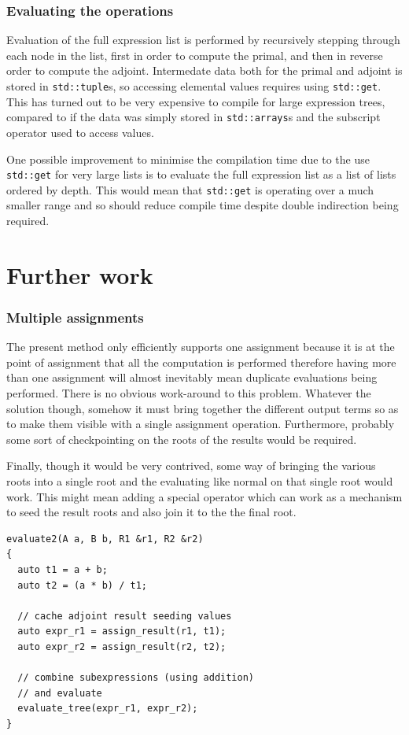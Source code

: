 \documentclass[a4paper,10pt]{article}
\begin{document}
\subsubsection{Evaluating the operations}
Evaluation of the full expression list is performed by recursively stepping through each node in the list, first in order to compute the primal, and then in reverse order to compute the adjoint. Intermedate data both for the primal and adjoint is stored in \texttt{std::tuple}s, so accessing elemental values requires using \texttt{std::get}. This has turned out to be very expensive to compile for large expression trees, compared to if the data was simply stored in \texttt{std::arrays}s and the subscript operator used to access values.

One possible improvement to minimise the compilation time due to the use \texttt{std::get} for very large lists is to evaluate the full expression list as a list of lists ordered by depth. This would mean that \texttt{std::get} is operating over a much smaller range and so should reduce compile time despite double indirection being required.

\section{Further work}
\subsubsection{Multiple assignments}
The present method only efficiently supports one assignment because it is at the point of assignment that all the computation is performed therefore having more than one assignment will almost inevitably mean duplicate evaluations being performed. There is no obvious work-around to this problem. Whatever the solution though, somehow it must bring together the different output terms so as to make them visible with a single assignment operation. Furthermore, probably some sort of checkpointing on the roots of the results would be required.

Finally, though it would be very contrived, some way of bringing the various roots into a single root and the evaluating like normal on that single root would work. This might mean adding a special operator which can work as a mechanism to seed the result roots and also join it to the the final root.\newline
\begin{lstlisting}[caption={Combining multiple roots into one.}, label=lst:multiple-roots]
evaluate2(A a, B b, R1 &r1, R2 &r2)
{
  auto t1 = a + b;
  auto t2 = (a * b) / t1;

  // cache adjoint result seeding values
  auto expr_r1 = assign_result(r1, t1);
  auto expr_r2 = assign_result(r2, t2);

  // combine subexpressions (using addition)
  // and evaluate
  evaluate_tree(expr_r1, expr_r2);
}
\end{lstlisting}
\end{document}

